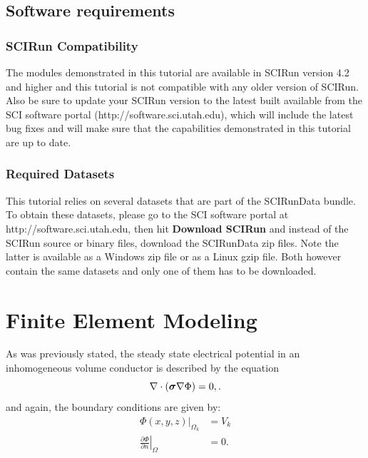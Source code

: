 \documentclass[fleqn,11pt,openany]{book}
\newcommand{\BM }[1]{\mbox{\boldmath $#1$}}
\begin{document}
\section{Software requirements}

\subsection{SCIRun Compatibility}

The modules demonstrated in this tutorial are available in SCIRun
version 4.2 and higher and this tutorial is not compatible with any
older version of SCIRun.  Also be sure to update your SCIRun version
to the latest built available from the SCI software portal
({http://software.sci.utah.edu}), which will include the latest bug
fixes and will make sure that the capabilities demonstrated in this
tutorial are up to date.

\subsection{Required Datasets}

This tutorial relies on several datasets that are part of the
SCIRunData bundle. To obtain these datasets, please go to the SCI
software portal at {http://software.sci.utah.edu}, then hit {\bf
Download SCIRun} and instead of the SCIRun source or binary files,
download the SCIRunData zip files. Note the latter is available as a
Windows zip file or as a Linux gzip file. Both however contain the
same datasets and only one of them has to be downloaded.



\chapter{Finite Element Modeling} \label{sec:fe}

As was previously stated, the steady state electrical potential in an
inhomogeneous volume conductor is described by the equation
%
\begin{equation} \nabla \cdot (\BM{\sigma} \nabla \Phi) =
0, \label{eq:eq}.
\end{equation}
%
and again, the boundary conditions are given by:
\begin{align} \Phi(x,y,z)|_{\Omega_k} &= V_k\\ \left. \frac{\partial
\Phi}{\partial n} \right|_\Omega &= 0.
\end{align}
\end{document}
